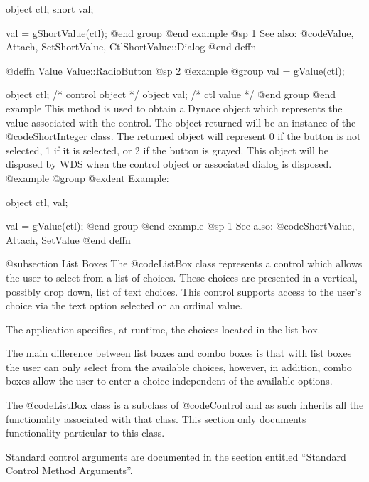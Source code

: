 object  ctl;
short   val;

val = gShortValue(ctl);
@end group
@end example
@sp 1
See also:  @code{Value, Attach, SetShortValue, CtlShortValue::Dialog}
@end deffn













@deffn {Value} Value::RadioButton
@sp 2
@example
@group
val = gValue(ctl);

object  ctl;   /*  control object  */
object  val;   /*  ctl value       */
@end group
@end example
This method is used to obtain a Dynace object which represents the value
associated with the control.  The object returned will be an instance of
the @code{ShortInteger} class.  The returned object will represent 0 if
the button is not selected, 1 if it is selected, or 2 if the button is grayed.
This object will be disposed by WDS when the control object or
associated dialog is disposed.
@example
@group
@exdent Example:

object  ctl, val;

val = gValue(ctl);
@end group
@end example
@sp 1
See also:  @code{ShortValue, Attach, SetValue}
@end deffn











@subsection List Boxes
The @code{ListBox} class represents a control which allows the user
to select from a list of choices.  These choices are presented in
a vertical, possibly drop down, list of text choices.  This control
supports access to the user's choice via the text option selected or
an ordinal value.

The application specifies, at runtime, the choices located in the list box.

The main difference between list boxes and combo boxes is that with list
boxes the user can only select from the available choices, however, in
addition, combo boxes allow the user to enter a choice independent of
the available options.

The @code{ListBox} class is a subclass of @code{Control} and as such
inherits all the functionality associated with that class.  This section
only documents functionality particular to this class.

Standard control arguments are documented in the section entitled
``Standard Control Method Arguments''.














